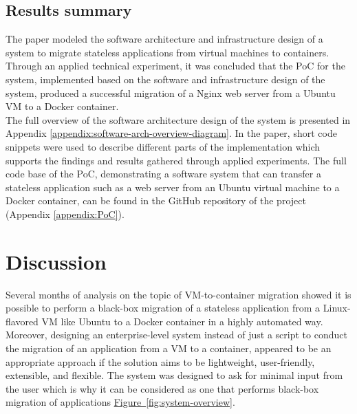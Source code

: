 \documentclass[twocolumn]{article}
\newcommand{\FigRef}[1]{\hyperref[#1]{Figure~\ref{#1}}}
\begin{document}
\subsection{Results summary}
The paper modeled the software architecture and infrastructure design of a system to migrate stateless applications from virtual machines to containers. Through an applied technical experiment, it was concluded that the PoC for the system, implemented based on the software and infrastructure design of the system, produced a successful migration of a Nginx web server from a Ubuntu VM to a Docker container. \\

The full overview of the software architecture design of the system is presented in Appendix \ref{appendix:software-arch-overview-diagram}. In the paper, short code snippets were used to describe different parts of the implementation which supports the findings and results gathered through applied experiments. The full code base of the PoC, demonstrating a software system that can transfer a stateless application such as a web server from an Ubuntu virtual machine to a Docker container, can be found in the GitHub repository of the project (Appendix \ref{appendix:PoC}).

\section{Discussion}
Several months of analysis on the topic of VM-to-container migration showed it is possible to perform a black-box migration of a stateless application from a Linux-flavored VM like Ubuntu to a Docker container in a highly automated way. Moreover, designing an enterprise-level system instead of just a script to conduct the migration of an application from a VM to a container, appeared to be an appropriate approach if the solution aims to be lightweight, user-friendly, extensible, and flexible. The system was designed to ask for minimal input from the user which is why it can be considered as one that performs black-box migration of applications \FigRef{fig:system-overview}.
\end{document}
